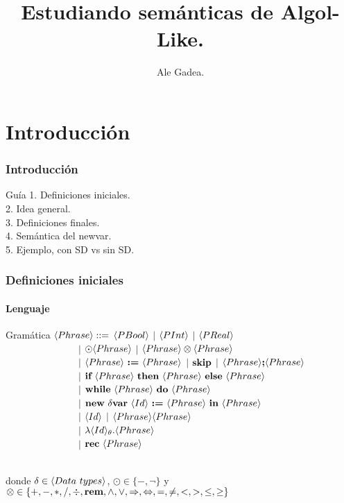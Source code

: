 \documentclass{beamer} %
\begin{document}
\title{Estudiando sem\'anticas de Algol-Like.}
\author{{Ale Gadea.}\\
\vspace*{0.5cm}}
\frame{\titlepage}

\section{Introducci\'on}

\begin{frame}
\frametitle{Introducci\'on}
\begin{block}{Gu\'ia}
1. Definiciones iniciales.\\
2. Idea general.\\
3. Definiciones finales.\\
4. Sem\'antica del newvar.\\
5. Ejemplo, con SD vs sin SD.
\end{block}
\end{frame}

\begin{frame}
\frametitle{Definiciones iniciales}
\framesubtitle{Lenguaje}

\begin{block}{Gram\'atica}
$\langle Phrase \rangle ::=$ $\langle PBool \rangle$ $|$ $\langle PInt \rangle$ $|$ $\langle PReal \rangle$ \\
\ \ \ \ \ \ \ \ \ \ \ \ \ \ \ $|$ 
$\odot \langle Phrase \rangle$ $|$ $\langle Phrase \rangle \otimes \langle Phrase \rangle $ \\ 
\ \ \ \ \ \ \ \ \ \ \ \ \ \ \ $|$ 
$\langle Phrase \rangle \ \textbf{:=} \ \langle Phrase \rangle$ $|$ $\textbf{skip}$ $|$ $\langle Phrase \rangle \textbf{;} \langle Phrase \rangle$ \\ 
\ \ \ \ \ \ \ \ \ \ \ \ \ \ \ $|$ 
$\textbf{if} \ \langle Phrase \rangle \ \textbf{then} \ \langle Phrase \rangle \ \textbf{else} \ \langle Phrase \rangle$ \\ 
\ \ \ \ \ \ \ \ \ \ \ \ \ \ \ $|$ 
$\textbf{while} \ \langle Phrase \rangle \ \textbf{do} \ \langle Phrase \rangle$ \\ 
\ \ \ \ \ \ \ \ \ \ \ \ \ \ \ $|$ 
$\textbf{new} \ \delta \textbf{var} \ \langle Id \rangle \ \textbf{:=} \ \langle Phrase \rangle \ \textbf{in} \ \langle Phrase \rangle$ \\ 
\ \ \ \ \ \ \ \ \ \ \ \ \ \ \ $|$ 
$\langle Id \rangle$ $|$ $\langle Phrase \rangle\langle Phrase \rangle$ \\
\ \ \ \ \ \ \ \ \ \ \ \ \ \ \ $|$ 
$\lambda \langle Id \rangle_{\theta} . \langle Phrase \rangle $ \\
\ \ \ \ \ \ \ \ \ \ \ \ \ \ \ $|$ 
$\textbf{rec} \ \langle Phrase \rangle$\\
\

donde $\delta \in \lrangles{Data \ types}$, $\odot \in \{-, \neg\}$ y 
$\otimes \in \{+,-,*,/,\div,\textbf{rem},\wedge,\vee,\Rightarrow,\Leftrightarrow, =,\neq,<,>,\leq,\geq\}$\\
\end{block}

\end{frame}
\end{document}
